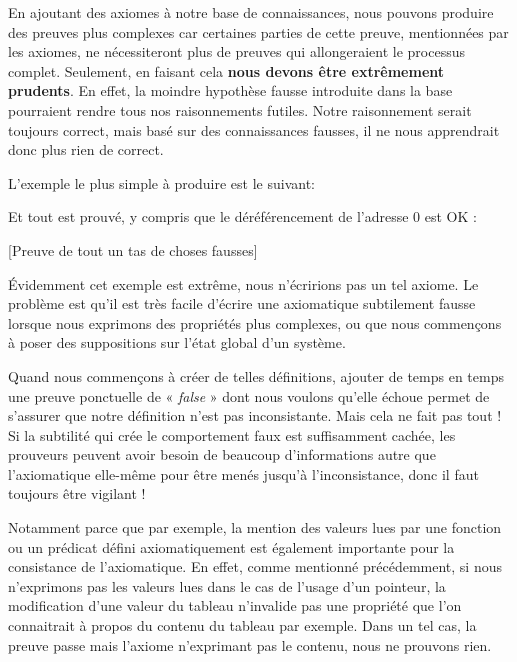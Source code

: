 

En ajoutant des axiomes à notre base de connaissances, nous pouvons produire des
preuves plus complexes car certaines parties de cette preuve, mentionnées par 
les axiomes, ne nécessiteront plus de preuves qui allongeraient le processus 
complet. Seulement, en faisant cela \textbf{nous devons être extrêmement prudents}.
En effet, la moindre hypothèse fausse introduite dans la base pourraient rendre
tous nos raisonnements futiles. Notre raisonnement serait toujours correct, mais
basé sur des connaissances fausses, il ne nous apprendrait donc plus rien de correct.



L'exemple le plus simple à produire est le suivant:






Et tout est prouvé, y compris que le déréférencement de l'adresse 0 est OK :



[Preuve de tout un tas de choses fausses]


Évidemment cet exemple est extrême, nous n'écririons pas un tel axiome. Le
problème est qu'il est très facile d'écrire une axiomatique subtilement fausse
lorsque nous exprimons des propriétés plus complexes, ou que nous commençons à
poser des suppositions sur l'état global d'un système.



Quand nous commençons à créer de telles définitions, ajouter de temps en 
temps une preuve ponctuelle de « \textit{false} » dont nous voulons qu'elle échoue permet 
de s'assurer que notre définition n'est pas inconsistante. Mais cela ne fait pas 
tout ! Si la subtilité qui crée le comportement faux est suffisamment cachée, les
prouveurs peuvent avoir besoin de beaucoup d'informations autre que l'axiomatique
elle-même pour être menés jusqu'à l'inconsistance, donc il faut toujours être 
vigilant !



Notamment parce que par exemple, la mention des valeurs lues par une fonction
ou un prédicat défini axiomatiquement est également importante pour la 
consistance de l'axiomatique. En effet, comme mentionné précédemment, si nous
n'exprimons pas les valeurs lues dans le cas de l'usage d'un pointeur, la 
modification d'une valeur du tableau n'invalide pas une propriété que l'on 
connaitrait à propos du contenu du tableau par exemple. Dans un tel cas, la 
preuve passe mais l'axiome n'exprimant pas le contenu, nous ne prouvons rien.



